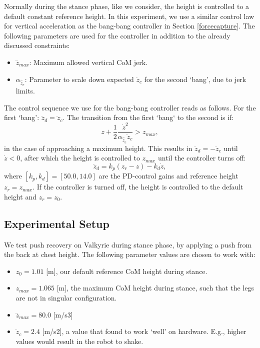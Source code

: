 \documentclass[letterpaper, 10 pt, conference]{ieeeconf}  %
\newcommand{\zmax}{z_{max}}
\newcommand{\rcmpd}{\mathbf{r}_{cop,d}}
\newcommand{\icpe}{\boldsymbol{\xi}_e}
\begin{document}
Normally during the stance phase, like we consider, the height is controlled to a default constant reference height. In this experiment, we use a similar control law for vertical acceleration as the bang-bang controller in Section \ref{forcecapture}. The following parameters are used for the controller in addition to the already discussed constraints:
\begin{itemize}
	\item $\dddot{z}_{max}$: Maximum allowed vertical CoM jerk.
	\item $\alpha_{\hat{\ddot{z}}_{c}}$: Parameter to scale down expected $\ddot{z}_c$ for the second `bang', due to jerk limits.
\end{itemize}

The control sequence we use for the bang-bang controller reads as follows. For the first `bang': $\ddot{z}_d=\ddot{z}_c$. The transition from the first `bang` to the second is if:
\begin{equation}
	z+\frac{1}{2}\frac{\dot{z}^2}{\alpha_{\hat{\ddot{z}}_{c}}\ddot{z}_{c}} >\zmax,
\end{equation}
in the case of approaching a maximum height. This results in $\ddot{z}_d=-\ddot{z}_c$ until $\dot{z}<0$, after which the height is controlled to $\zmax$ until the controller turns off:
\begin{equation}
	\ddot{z}_d = k_p(z_r-z)-k_d\dot{z},
\end{equation}
where $[k_p,k_d]=[50.0,14.0]$ are the PD-control gains and reference height $z_r= \zmax$. If the controller is turned off, the height is controlled to the default height and $z_r=z_0$.
\subsection{Experimental Setup}
We test push recovery on Valkyrie during stance phase, by applying a push from the back at chest height. The following parameter values are chosen to work with:
\begin{itemize}
\item $z_0=1.01$ [m], our default reference CoM height during stance.
\item $\zmax=1.065$ [m], the maximum CoM height during stance, such that the legs are not in singular configuration.
\item $\dddot{z}_{max} = 80.0$ [m/s3]
\item $\ddot{z}_c=2.4$ [m/s2], a value that found to work `well' on hardware. E.g., higher values would result in the robot to shake.
\end{itemize}
\end{document}
